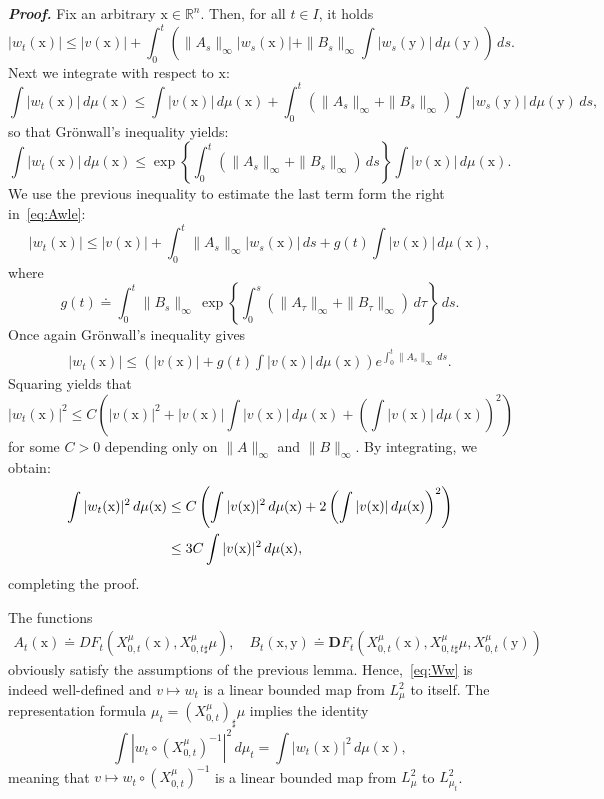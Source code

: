 \documentclass[sn-mathphys-num]{sn-jnl}
\numberwithin{equation}{section}
\theoremstyle{mythm}
\theoremstyle{mydef}
\renewenvironment{proof}{\smallskip\noindent\emph{\textbf{Proof.}}%
  \hspace{1pt}}{\hspace{-5pt}{\nobreak\quad\nobreak\hfill\nobreak%
    $\square$\vspace{2pt}\par}\smallskip\goodbreak}
\renewcommand{\d}{\,d}
\begin{document}
\begin{proof}
 Fix an arbitrary \( \mathrm{x}\in \mathbb{R}^n \).
Then, for all \( t\in I \), it holds
\begin{equation}
  \label{eq:Awle}
    |w_t(\mathrm{x})| \le |v(\mathrm{x})| + \int_{0}^t \left(\|A_s\|_{\infty} |w_s(\mathrm{x})| + \|B_{s}\|_{\infty}\int |w_s(\mathrm{y})|\d \mu(\mathrm{y})\right)\d s.
\end{equation}
  Next we integrate with respect to \( \mathrm{x} \):
  \[
   \int |w_t(\mathrm{x})|\d \mu(\mathrm{x}) \le \int|v(\mathrm{x})|\d \mu(\mathrm{x}) + \int_{0}^t \left(\|A_s\|_{\infty}+ \|B_{s}\|_{\infty}\right)\int |w_s(\mathrm{y})|\d \mu(\mathrm{y})\d s,
 \]
 so that Gr\"onwall's inequality yields:
 \[
   \int |w_t(\mathrm{x})|\d \mu(\mathrm{x})\le \exp \left\{\int_{0}^t \left(\|A_s\|_{\infty}+ \|B_{s}\|_{\infty}\right)\d s  \right\}\int|v(\mathrm{x})|\d \mu(\mathrm{x}).
 \]
 We use the previous inequality to estimate the last term form the right in~\eqref{eq:Awle}:
 \[
    |w_t(\mathrm{x})| \le |v(\mathrm{x})| + \int_{0}^t \|A_s\|_{\infty}|w_s(\mathrm{x})|\d s + g(t)\int|v(\mathrm{x})|\d \mu(\mathrm{x}),
  \]
  where
  \[
    g(t) \doteq \int_{0}^t\|B_s\|_{\infty}\,\exp \left\{\int_{0}^s \left(\|A_\tau\|_{\infty}+ \|B_{\tau}\|_{\infty}\right)\d \tau  \right\}\d s.
  \]
  Once again Gr\"onwall's inequality gives
  \begin{align}
    |w_t(\mathrm{x})| \le \left( |v(\mathrm{x})| + g(t) \int|v(\mathrm{x})|\d \mu(\mathrm{x}) \right) e^{\int_{0}^t\|A_s\|_{\infty}\d s}.\label{w-infti}
  \end{align}
  Squaring yields that
  \[
    |w_t(\mathrm{x})|^2 \le C\left( |v(\mathrm{x})|^{2} + |v(\mathrm{x})| \int|v(\mathrm{x})|\d \mu(\mathrm{x}) + \left(\int|v(\mathrm{x})|\d \mu(\mathrm{x})\right)^2\right)
  \]
  for some \( C>0 \) depending only on \( \|A\|_{\infty} \) and \( \|B\| _{\infty}\).
  By integrating, we obtain:
  \begin{align}
    \int|w_t(\mathrm{x})|^2 \d \mu(\mathrm{x})
    &\le C\left( \int|v(\mathrm{x})|^{2}\d\mu(\mathrm{x}) + 2\left(\int|v(\mathrm{x})|\d \mu(\mathrm{x})\right)^2\right)\notag\\
    &\le 3C \int|v(\mathrm{x})|^{2}\d\mu(\mathrm{x}),\label{eq:wu}
  \end{align}
completing the proof.
\end{proof}


The functions
\begin{align*}
  A_{t}(\mathrm{x}) \doteq DF_t\left(X^{\mu}_{0,t}(\mathrm{x}), X^{\mu}_{0,t\sharp}\mu\right), \quad
  B_t(\mathrm{x},\mathrm{y})\doteq \bm{D}F_t\left(X^{\mu}_{0,t}(\mathrm{x}), X^{\mu}_{0,t\sharp}\mu, X^{\mu}_{0,t}(\mathrm{y})\right)
\end{align*}
obviously satisfy the assumptions of the previous lemma.
Hence,~\eqref{eq:Ww} is indeed well-defined and \( v\mapsto w_t \) is a linear bounded map from \( {L}^2_{\mu} \) to itself.
The representation formula \( \mu_t = (X^{\mu}_{0,t})_{\sharp}\mu \) implies the identity
\[
  \int\left|w_t\circ (X_{0,t}^{\mu})^{-1}\right|^{2}\d \mu_t = \int |w_t(\mathrm{x})|^2\d \mu(\mathrm{x}),
\]
meaning that \( v \mapsto w_t\circ (X_{0,t}^{\mu})^{-1} \) is a linear bounded map from \( {L}^2_{\mu} \) to \( L^2_{\mu_t} \).
\end{document}
